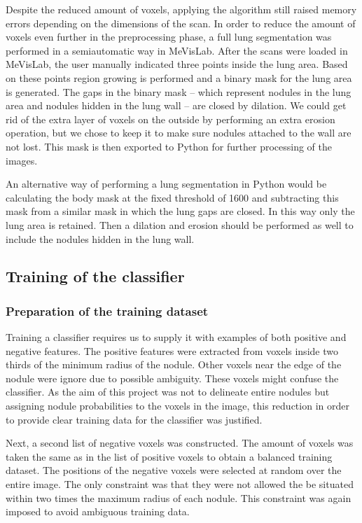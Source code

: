 Despite the reduced amount of voxels, applying the algorithm still raised memory
errors depending on the dimensions of the scan. In order to reduce the amount of
voxels even further in the preprocessing phase, a full lung segmentation was
performed in a semiautomatic way in MeVisLab. After the scans were loaded in
MeVisLab, the user manually indicated three points inside the lung area. Based
on these points region growing is performed and a binary mask for the lung area
is generated. The gaps in the binary mask -- which represent nodules in the lung
area and nodules hidden in the lung wall -- are closed by dilation. We could get
rid of the extra layer of voxels on the outside by performing an extra erosion
operation, but we chose to keep it to make sure nodules attached to the wall are
not lost. This mask is then exported to Python for further processing of the
images.

An alternative way of performing a lung segmentation in Python would be
calculating the body mask at the fixed threshold of 1600 and subtracting this
mask from a similar mask in which the lung gaps are closed. In this way only the
lung area is retained. Then a dilation and erosion should be performed as well
to include the nodules hidden in the lung wall.

\subsection{Training of the classifier}
\subsubsection{Preparation of the training dataset}
Training a classifier requires us to supply it with examples of both positive
and negative features. The positive features were extracted from voxels inside
two thirds of the minimum radius of the nodule. Other voxels near the edge of
the nodule were ignore due to possible ambiguity. These voxels might confuse the
classifier. As the aim of this project was not to delineate entire nodules but
assigning nodule probabilities to the voxels in the image, this reduction in
order to provide clear training data for the classifier was justified.

Next, a second list of negative voxels was constructed. The amount of voxels was
taken the same as in the list of positive voxels to obtain a balanced training
dataset. The positions of the negative voxels were selected at random over the
entire image. The only constraint was that they were not allowed the be situated
within two times the maximum radius of each nodule. This constraint was again
imposed to avoid ambiguous training data.

